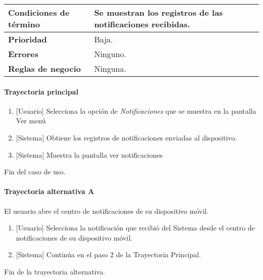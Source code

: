 \begin{longtable}{|J{5cm}|J{10.3cm}|}
		\\ \hline
	\textbf{Condiciones de término} & Se muestran los registros de las notificaciones recibidas.
		\\ \hline 
	\textbf{Prioridad} & 
		Baja. \\ \hline
	\textbf{Errores} & Ninguno.
		\\ \hline
	\textbf{Reglas de negocio} & Ninguna.
		 \\ \hline
\end{longtable}

\paragraph{Trayectoria principal}
	\begin{enumerate}
		\item {[Usuario]} Selecciona la opción de \textit{Notificaciones} que se muestra en la pantalla Ver menú%
		\item {[Sistema]} Obtiene los registros de notificaciones enviadas al dispositivo.
		\item {[Sistema]} Muestra la pantalla ver notificaciones %
	\end{enumerate}
	Fin del caso de uso.

\paragraph{Trayectoria alternativa A} \label{SUB-M-CU1.9:TA}
 	El usuario abre el centro de notificaciones de su dispositivo móvil.
 	\begin{enumerate}[label=A\arabic*.]
 	    \item {[Usuario]} Selecciona la notificación que recibió del Sistema desde el centro de notificaciones de su dispositivo móvil.
 		\item {[Sistema]} Continúa en el paso 2 de la Trayectoria Principal. %
 	\end{enumerate}
 	Fin de la trayectoria alternativa.
